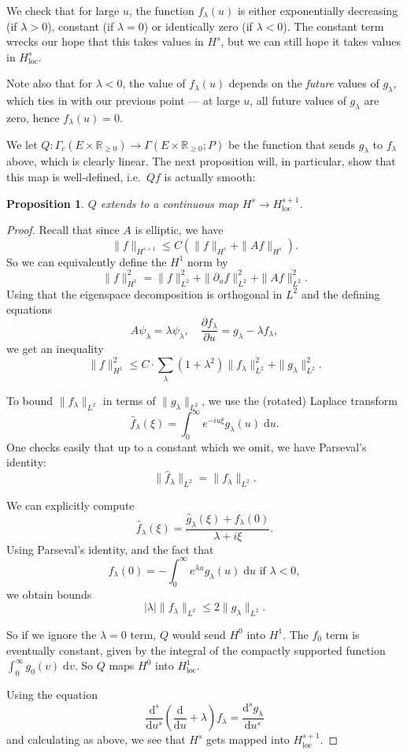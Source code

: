 \documentclass{shortart}
\newtheorem{prop}[thm]{Proposition}
\theoremstyle{definition}
\newcommand\loc{\mathrm{loc}}
\newcommand\R{\mathbb{R}}
\renewcommand\d{\mathrm{d}}
\begin{document}
We check that for large $u$, the function $f_\lambda(u)$ is either exponentially decreasing (if $\lambda > 0$), constant (if $\lambda = 0$) or identically zero (if $\lambda < 0$). The constant term wrecks our hope that this takes values in $H^s$, but we can still hope it takes values in $H^s_{\loc}$.

Note also that for $\lambda < 0$, the value of $f_\lambda(u)$ depends on the \emph{future} values of $g_\lambda$, which ties in with our previous point --- at large $u$, all future values of $g_\lambda$ are zero, hence $f_\lambda(u) = 0$.

We let $Q\colon \Gamma_c(E \times \R_{\geq 0}) \to \Gamma(E \times \R_{\geq 0}; P)$ be the function that sends $g_\lambda$ to $f_\lambda$ above, which is clearly linear. The next proposition will, in particular, show that this map is well-defined, i.e.\ $Qf$ is actually smooth:
\begin{prop}
  $Q$ extends to a continuous map $H^s \to H^{s + 1}_{\loc}$.
\end{prop}

\begin{proof}
  Recall that since $A$ is elliptic, we have
  \[
    \|f\|_{H^{s + 1}} \leq C (\|f\|_{H^s} + \|Af\|_{H^s}).
  \]
  So we can equivalently define the $H^1$ norm by
  \[
    \|f\|_{H^1}^2 = \|f\|^2_{L^2} + \|\partial_u f\|^2_{L^2} + \|Af\|^2_{L^2}.
  \]
  Using that the eigenspace decomposition is orthogonal in $L^2$ and the defining equations
  \[
    A \psi_\lambda = \lambda \psi_\lambda,\quad \frac{\partial f_\lambda}{\partial u} = g_\lambda  - \lambda f_\lambda,
  \]
  we get an inequality
  \[
    \|f\|_{H^1}^2 \leq C \cdot \sum_\lambda (1 + \lambda^2) \|f_\lambda\|^2_{L^2} + \|g_\lambda\|^2_{L^2}.
  \]

  To bound $\|f_\lambda\|_{L^2}$ in terms of $\|g_\lambda\|_{L^2}$, we use the (rotated) Laplace transform
  \[
    \hat{f}_\lambda(\xi) = \int_0^\infty e^{-iu\xi} g_\lambda(u) \;\d u.
  \]
  One checks easily that up to a constant which we omit, we have Parseval's identity:
  \[
    \|\hat{f}_\lambda\|_{L^2} = \|f_\lambda\|_{L^2}.
  \]

  We can explicitly compute
  \[
    \hat{f}_\lambda(\xi) = \frac{\hat{g}_\lambda(\xi) + f_\lambda(0)}{\lambda + i \xi}.
  \]
  Using Parseval's identity, and the fact that
  \[
    f_\lambda(0) = -\int_0^\infty e^{\lambda u} g_\lambda(u) \;\d u\text{ if } \lambda < 0,
  \]
  we obtain bounds
  \[
    |\lambda| \|f_\lambda\|_{L^2} \leq 2 \|g_\lambda\|_{L^2}.
  \]

  So if we ignore the $\lambda = 0$ term, $Q$ would send $H^0$ into $H^1$. The $f_0$ term is eventually constant, given by the integral of the compactly supported function $\int_0^\infty g_0(v)\;\d v$. So $Q$ maps $H^0$ into $H^1_{\loc}$.

  Using the equation
  \[
    \frac{\d^s}{\d u^s} \left(\frac{\d}{\d u} + \lambda\right) f_\lambda = \frac{\d^s g_\lambda}{\d u^s}
  \]
  and calculating as above, we see that $H^s$ gets mapped into $H^{s + 1}_{\loc}$.
\end{proof}
\end{document}
